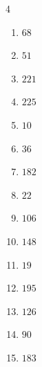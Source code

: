 \begin{multicols}{4}
\begin{enumerate}

  \item $68$


  \item $51$


  \item $221$


  \item $225$


  \item $10$


\columnbreak %

  \item $36$


  \item $182$


  \item $22$


  \item $106$


  \item $148$


  \item $19$


  \item $195$


  \item $126$


  \item $90$


  \item $183$



\end{enumerate}
\end{multicols}

